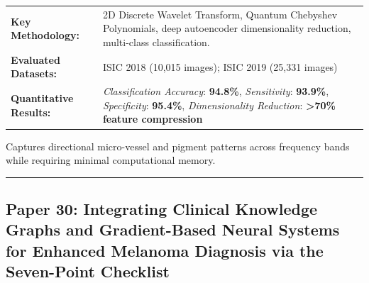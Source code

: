 \documentclass[10pt,a4paper]{article}
\begin{document}
\vspace{4pt}
\begin{tabularx}{\linewidth}{p{3.2cm}X}
\toprule
\textbf{Key Methodology:} & 2D Discrete Wavelet Transform, Quantum Chebyshev Polynomials, deep autoencoder dimensionality reduction, multi-class classification. \\
\textbf{Evaluated Datasets:} & ISIC 2018 (10,015 images); ISIC 2019 (25,331 images) \\
\textbf{Quantitative Results:} & \textit{Classification Accuracy}: \textbf{94.8\%}, \textit{Sensitivity}: \textbf{93.9\%}, \textit{Specificity}: \textbf{95.4\%}, \textit{Dimensionality Reduction}: \textbf{>70\% feature compression} \\
\bottomrule
\end{tabularx}
\vspace{4pt}
\begin{tcolorbox}[utilitybox,title=Clinical Utility and Real-World Impact]
Captures directional micro-vessel and pigment patterns across frequency bands while requiring minimal computational memory.
\end{tcolorbox}
\vspace{12pt}
\hrule
\vspace{12pt}
\subsection*{Paper 30: Integrating Clinical Knowledge Graphs and Gradient-Based Neural Systems for Enhanced Melanoma Diagnosis via the Seven-Point Checklist}
\end{document}
